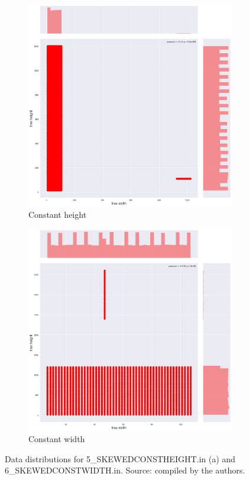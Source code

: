 \begin{figure}[H]
\centering
\begin{subfigure}{.5\textwidth}
  \centering
  \includegraphics[width=.8\linewidth]{img/5_SKEWEDCONSTHEIGHT_plot.png}
  \caption{Constant height}
  \label{fig:data:skewedconstheight}
\end{subfigure}%
\begin{subfigure}{.5\textwidth}
  \centering
  \includegraphics[width=.8\linewidth]{img/6_SKEWEDCONSTWIDTH_plot.png}
  \caption{Constant width}
  \label{fig:data:skewedconstwidth}
\end{subfigure}
\caption{Data distributions for 5\_SKEWEDCONSTHEIGHT.in (a) and 6\_SKEWEDCONSTWIDTH.in. Source: compiled by the authors.}
\label{fig:test}
\end{figure}

